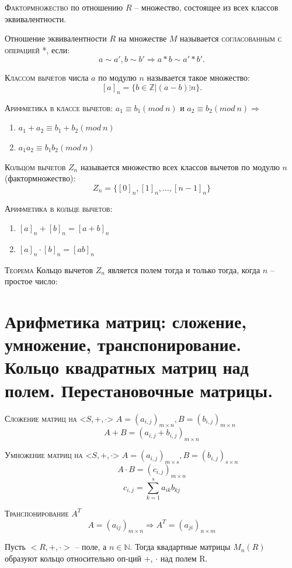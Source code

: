 \documentclass{article}
\begin{document}
\textsc{Фактормножество} по отношению $R$ – множество, состоящее из всех классов эквивалентности.

Отношение эквивалентности $R$ на множестве $M$ называется \textsc{согласованным с операцией} *, если:
$$a\sim a', b\sim b' \Rightarrow a*b\sim a'*b'.$$

\textsc{Классом вычетов} числа $a$ по модулю $n$ называется такое множество:
$$[a]_n=\{b\in \mathbb{Z}|(a-b)\vdots n\}.$$

\textsc{Арифметика в классе вычетов:}
$a_1\equiv b_1 (mod\ n)$ и $a_2\equiv b_2 (mod\ n)\Rightarrow$
\begin{enumerate}
    \item $a_1+a_2\equiv b_1+b_2 (mod\ n)$
    \item $a_1a_2\equiv b_1b_2 (mod\ n)$
\end{enumerate}

\textsc{Кольцом вычетов} $Z_n$ называется множество всех классов вычетов по модулю $n$ (фактормножество):
$$Z_n=\{[0]_n, [1]_n,\dots , [n-1]_n\}$$

\textsc{Арифметика в кольце вычетов:}
\begin{enumerate}
    \item $[a]_n+[b]_n=[a+b]_n$
    \item $[a]_n\cdot [b]_n=[ab]_n$
\end{enumerate}

\textsc{Теорема} Кольцо вычетов $Z_n$ является полем тогда и только тогда, когда $n$ – простое число:

\section{Арифметика матриц: сложение, умножение, транспонирование. Кольцо квадратных матриц над полем. Перестановочные матрицы.}

\textsc{Сложение матриц на {<$S, +, \cdot$>}} $A=(a_{i,j})_{m\times n}, B=(b_{i,j})_{m\times n}$
$$A+B=(a_{i,j}+b_{i,j})_{m\times n}$$

\textsc{Умножение матриц на {<$S, +, \cdot$>}} $A=(a_{i,j})_{m\times s}, B=(b_{i,j})_{s\times n}$
$$A\cdot B=(c_{i,j})_{m\times n}$$
$$c_{i,j}=\sum_{k=1}^{s} a_{ik}b_{kj}$$

\textsc{Транспонирование $A^T$}
$$A=(a_{ij})_{m\times n}\Rightarrow A^T=(a_{ji})_{n\times m}$$

Пусть $<R, +, \cdot>$ – поле, а $n\in \mathbb{N}$. Тогда квадартные матрицы $M_n(R)$ образуют кольцо относительно оп-ций +, $\cdot$ над полем R.
\end{document}
